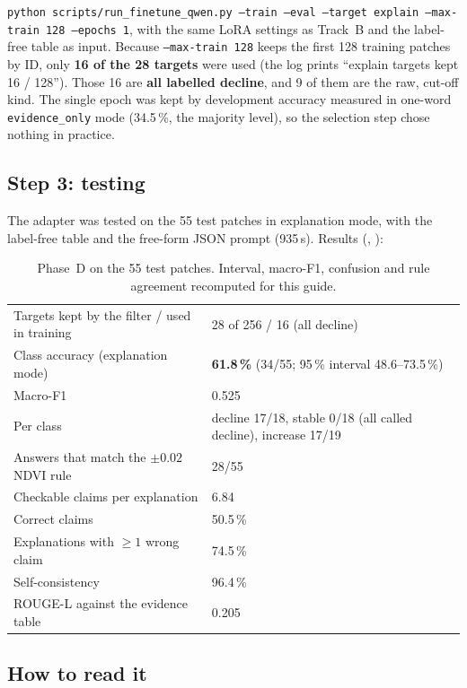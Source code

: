\texttt{python scripts/run\_finetune\_qwen.py --train --eval --target explain --max-train 128 --epochs 1}, with the same LoRA settings as Track~B and the label-free table as input. Because \texttt{--max-train 128} keeps the first 128 training patches by ID, only \textbf{16 of the 28 targets} were used (the log prints ``explain targets kept 16 / 128''). Those 16 are \textbf{all labelled decline}, and 9 of them are the raw, cut-off kind. The single epoch was kept by development accuracy measured in one-word \texttt{evidence\_only} mode (34.5\,\%, the majority level), so the selection step chose nothing in practice.

\subsection{Step 3: testing}

The adapter was tested on the 55 test patches in explanation mode, with the label-free table and the free-form JSON prompt (935\,s). Results (, ):

\begin{table}[H]
\centering
\caption{Phase~D on the 55 test patches. Interval, macro-F1, confusion and rule agreement recomputed for this guide.}
\label{tab:phaseD}
\small
\begin{tabular}{L{6.0cm}L{8.2cm}}
\toprule
Targets kept by the filter / used in training & 28 of 256 / 16 (all decline) \\
Class accuracy (explanation mode) & \textbf{61.8\,\%} (34/55; 95\,\% interval 48.6--73.5\,\%) \\
Macro-F1 & 0.525 \\
Per class & decline 17/18, stable 0/18 (all called decline), increase 17/19 \\
Answers that match the $\pm0.02$ NDVI rule & 28/55 \\
Checkable claims per explanation & 6.84 \\
Correct claims & 50.5\,\% \\
Explanations with $\ge 1$ wrong claim & 74.5\,\% \\
Self-consistency & 96.4\,\% \\
ROUGE-L against the evidence table & 0.205 \\
\bottomrule
\end{tabular}
\end{table}

\subsection{How to read it}

